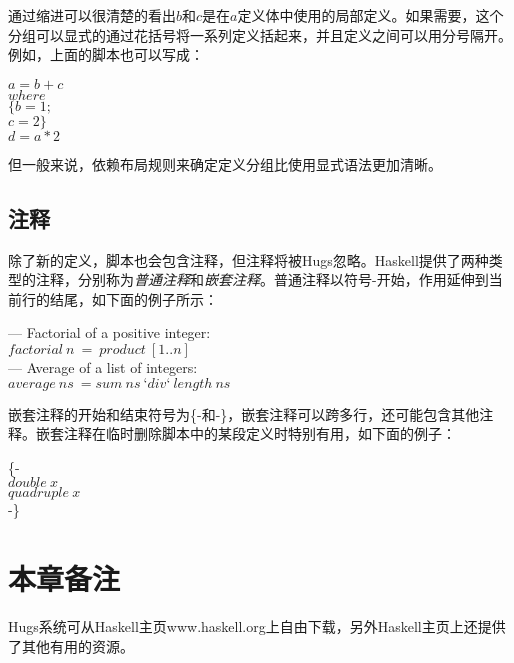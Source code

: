 通过缩进可以很清楚的看出$b$和$c$是在$a$定义体中使用的局部定义。如果需要，这个分组可以显式的通过花括号将一系列定义括起来，并且定义之间可以用分号隔开。例如，上面的脚本也可以写成：

\noindent\hspace*{1cm} $a = b + c$\\
\hspace*{2cm} $        where $\\
\hspace*{3cm} $            \{b = 1;$\\
\hspace*{3cm} $            c = 2\}$\\
\hspace*{1cm} $d = a * 2$

但一般来说，依赖布局规则来确定定义分组比使用显式语法更加清晰。

\subsection{注释}

除了新的定义，脚本也会包含注释，但注释将被Hugs忽略。Haskell提供了两种类型的注释，分别称为\textit{普通注释}和\textit{嵌套注释}。普通注释以符号-开始，作用延伸到当前行的结尾，如下面的例子所示：

\noindent\hspace*{1cm} — Factorial of a positive integer:\\
\hspace*{1cm} $factorial~n~=~product~[1 . . n ]$\\
\hspace*{1cm} — Average of a list of integers:\\
\hspace*{1cm} $average~ns~= sum~ns~‘div ‘~length~ns$

嵌套注释的开始和结束符号为\{-和-\}，嵌套注释可以跨多行，还可能包含其他注释。嵌套注释在临时删除脚本中的某段定义时特别有用，如下面的例子：

\noindent\hspace*{1cm} \{-\\
\hspace*{1cm} $double~x$\\
\hspace*{1cm} $quadruple~x$\\
\hspace*{1cm} -\}

\section{本章备注}
Hugs系统可从Haskell主页www.haskell.org上自由下载，另外Haskell主页上还提供了其他有用的资源。

